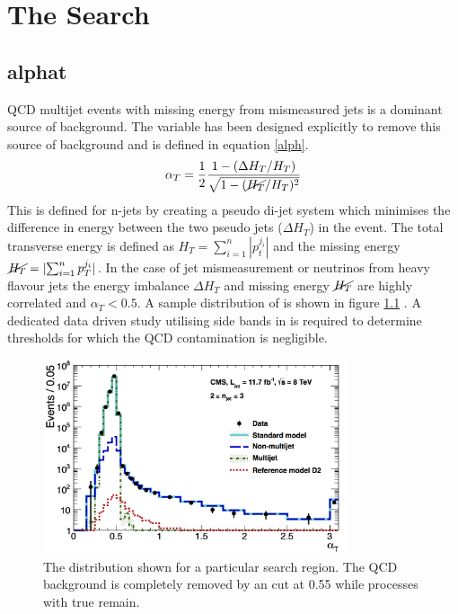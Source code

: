 
\chapter{The \alphat Search} %

\label{Chapter2} %



\section{alphat}
QCD multijet events with missing energy from mismeasured jets is a dominant source of background\cite{randall}. The \alphat variable has been designed explicitly to remove this source of background and is defined in equation \ref{alph}.
\begin{equation}
\label{alph}
\alpha_T=\frac{1}{2}\frac{1-(\Delta H_T/H_T)}{\sqrt{1-(\cancel{H_T}/H_T)^2}}
\end{equation}
This is defined for n-jets by creating a pseudo di-jet system which minimises the difference in energy between the two pseudo jets ($\Delta H_T$) in the event. The total transverse energy is defined as $H_T=\sum_{i=1}^n|p_t^{j_i}|$ and the missing energy $\cancel{H_T}=|{\sum_{i=1}^n p_T^{j_i}}|$. In the case of jet mismeasurement or neutrinos from heavy flavour jets the energy imbalance $\Delta H_T$ and missing energy $\cancel{H_T}$ are highly correlated and $\alpha_T<0.5$. A sample distribution of \alphat is shown in figure \ref{alphdis} \cite{CMSAT8}. A dedicated data driven study utilising side bands in \alphat is required to determine thresholds for which the QCD contamination is negligible.
\begin{figure}
\centering
    \includegraphics[width=0.8\textwidth]{Figures/sample_aT.jpg}
  \caption{The \alphat distribution shown for a particular search region. The QCD background is completely removed by an \alphat cut at 0.55 while processes with true \met remain.}
  \label{alphdis}
\end{figure}

